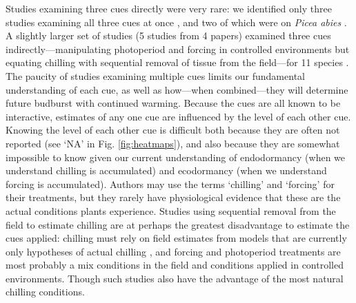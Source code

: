 \documentclass[11pt,letter]{article}
\begin{document}
Studies examining three cues directly were very rare: we identified only three studies examining all three cues at once \citep{Worrall:1967aa,Skuterud:1994aa,Sogaard:2008aa}, and two of which were on \emph{Picea abies} \citep{Worrall:1967aa,Sogaard:2008aa}. A slightly larger set of studies (5 studies from 4 papers) examined three cues indirectly---manipulating photoperiod and forcing in controlled environments but equating chilling with sequential removal of tissue from the field---for 11 species \citep{Schnabel:1987aa,Heide:1993,Partanen:1998aa,Basler:2014aa}. \\

The paucity of studies examining multiple cues limits our fundamental understanding of each cue, as well as how---when combined---they will determine future budburst with continued warming. Because the cues are all known to be interactive, estimates of any one cue are influenced by the level of each other cue. Knowing the level of each other cue is difficult both because they are often not reported (see `NA' in Fig. \ref{fig:heatmaps}), and also because they are somewhat impossible to know given our current understanding of endodormancy (when we understand chilling is accumulated) and ecodormancy (when we understand forcing is accumulated). Authors may use the terms `chilling' and `forcing' for their treatments, but they rarely have physiological evidence that these are the actual conditions plants experience. Studies using sequential removal from the field to estimate chilling are at perhaps the greatest disadvantage to estimate the cues applied: chilling must rely on field estimates from models that are currently only hypotheses of actual chilling \citep{dennis2003}, and forcing and photoperiod treatments are most probably a mix conditions in the field and conditions applied in controlled environments. Though such studies also have the advantage of the most natural chilling conditions. \\%
\end{document}
